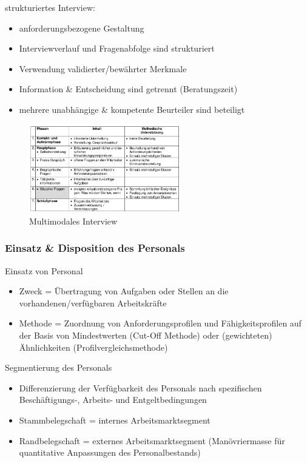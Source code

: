 \documentclass[11pt]{article}
\begin{document}
strukturiertes Interview:
\begin{itemize}
\item anforderungsbezogene Gestaltung
\item Interviewverlauf und Fragenabfolge sind strukturiert
\item Verwendung validierter/bewährter Merkmale
\item Information \& Entscheidung sind getrennt (Beratungszeit)
\item mehrere unabhängige \& kompetente Beurteiler sind beteiligt
\end{itemize}


\begin{figure}[htbp]
\centering
\includegraphics[width=250px]{./pictures/persint.png}
\caption{Multimodales Interview}
\end{figure} 
\subsubsection{Einsatz \& Disposition des Personals}
\label{sec:orge0b1872}
Einsatz von Personal
\begin{itemize}
\item Zweck =  Übertragung von Aufgaben oder Stellen an die vorhandenen/verfügbaren Arbeitskräfte
\item Methode = Zuordnung von Anforderungsprofilen und Fähigkeitsprofilen auf der Basis von Mindestwerten (Cut-Off Methode) oder (gewichteten) Ähnlichkeiten (Profilvergleichsmethode)
\end{itemize}

Segmentierung des Personals
\begin{itemize}
\item Differenzierung der Verfügbarkeit des Personals nach spezifischen Beschäftigungs-, Arbeits- und Entgeltbedingungen
\item Stammbelegschaft = internes Arbeitsmarktsegment
\item Randbelegschaft = externes Arbeitsmarktsegment (Manövriermasse für quantitative Anpassungen des Personalbestands)
\end{itemize}
\end{document}
